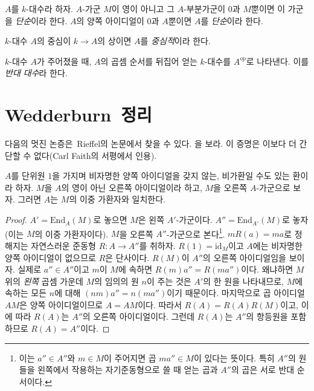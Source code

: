 \begin{definition}
\label{definition-simple}
$A$를 $k$-대수라 하자.
$A$-가군 $M$이 영이 아니고 그 $A$-부분가군이 $0$과 $M$뿐이면
이 가군을 {\it 단순}이라 한다.
$A$의 양쪽 아이디얼이 $0$과 $A$뿐이면 $A$를 {\it 단순}이라 한다.
\end{definition}

\begin{definition}
\label{definition-central}
$k$-대수 $A$의 중심이 $k \to A$의 상이면 $A$를 {\it 중심적}이라 한다.
\end{definition}

\begin{definition}
\label{definition-opposite}
$k$-대수 $A$가 주어졌을 때, $A$의 곱셈 순서를 뒤집어 얻는 $k$-대수를
$A^{op}$로 나타낸다. 이를 {\it 반대 대수}라 한다.
\end{definition}



\section{Wedderburn~정리}
\label{section-wedderburn}

\noindent
다음의 멋진 논증은~Rieffel의 논문에서 찾을 수 있다. \cite{Rieffel}을 보라.
이 증명은 이보다 더 간단할 수 없다(Carl Faith의 서평에서 인용).

\begin{lemma}
\label{lemma-rieffel}
$A$를 단위원 $1$을 가지며 비자명한 양쪽 아이디얼을 갖지 않는,
비가환일 수도 있는 환이라 하자. $M$을 $A$의 영이 아닌 오른쪽 아이디얼이라
하고, $M$을 오른쪽 $A$-가군으로 보자. 그러면 $A$는 $M$의 이중 가환자와
일치한다.
\end{lemma}

\begin{proof}
$A' = \text{End}_A(M)$로 놓으면 $M$은 왼쪽 $A'$-가군이다.
$A'' = \text{End}_{A'}(M)$로 놓자(이는 $M$의 이중 가환자이다).
$M$을 오른쪽 $A''$-가군으로 본다\footnote{이는 $a'' \in A''$와
$m \in M$이 주어지면 곱 $m a'' \in M$이 있다는 뜻이다. 특히
$A''$의 원들을 왼쪽에서 작용하는 자기준동형으로 쓸 때 얻는 곱과
$A''$의 곱은 서로 반대 순서이다.}.
$mR(a) = ma$로 정해지는 자연스러운 준동형 $R : A \to A''$를 취하자.
$R(1) = \text{id}_M$이고 $A$에는 비자명한 양쪽 아이디얼이 없으므로
$R$은 단사이다. $R(M)$이 $A''$의 오른쪽 아이디얼임을 보이자. 실제로
$a'' \in A''$이고 $m$이 $M$에 속하면 $R(m)a'' = R(ma'')$이다.
왜냐하면 $M$ 위의 {\it 왼쪽} 곱셈 가운데 $M$의 임의의 원 $n$이 주는 것은
$A'$의 한 원을
나타내므로, $M$에 속하는 모든 $n$에 대해
$(nm)a'' = n(ma'')$이기 때문이다.
마지막으로 곱 아이디얼 $AM$은 양쪽 아이디얼이므로 $A = AM$이다.
따라서 $R(A) = R(A)R(M)$이고, 이에 따라 $R(A)$는 $A''$의 오른쪽
아이디얼이다. 그런데 $R(A)$는 $A''$의 항등원을 포함하므로
$R(A) = A''$이다.
\end{proof}

